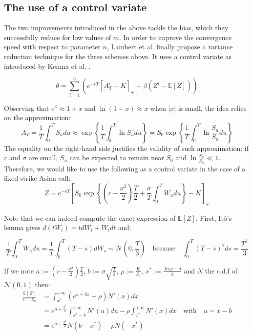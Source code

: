 \documentclass{article}
\begin{document}
\subsection{The use of a control variate}

The two improvements introduced in the above tackle the bias, which they successfully reduce for low values of $m$.
In order to improve the convergence speed with respect to parameter $n$,
Lambert et al. \cite{main} finally propose a variance reduction technique
for the three schemes above. It uses a control variate as introduced by Kemna et al. \cite{Vorst}.

\begin{equation}
	\theta = \sum_{i=1}^n \left( e^{-rT} \left[ A_T^i - K \right]_+ + \beta \left( Z^i - \mathbb E [Z] \right) \right)
	\tag{$\ast$}
\end{equation}

Observing that $e^x \approx 1 + x$ and $\ln(1 + x) \approx x$ when $| x |$ is small,
the idea relies on the approximation:
\[
	A_T = \frac{1}{T} \int_0^T S_u du \approx \exp \left\{ \frac{1}{T} \int_0^T \ln S_u du \right\}
	= S_0 \exp \left\{ \frac{1}{T} \int_0^T \ln \frac{S_u}{S_0} du \right\}
\]
The equality on the right-hand side justifies the validity of such approximation: if $r$ and $\sigma$ are small,
$S_u$ can be expected to remain near $S_0$ and $\ln \frac{S_u}{S_0} \ll 1$.
Therefore, we would like to use the following as a control variate in the case of a fixed-strike Asian call:
\[
	Z
	= e^{-rT} \left[ S_0 \exp \left\{ \left( r - \frac{\sigma^2}{2} \right) \frac{T}{2} +
		\frac{\sigma}{T} \int_0^T W_u du \right\}
		- K \right]_+
\]

Note that we can indeed compute the exact expression of $\mathbb E[Z]$. First, It\^o's lemma
gives $d(tW_t) = tdW_t + W_tdt$ and:

\[
	\frac{1}{T} \int_0^T W_u du = \frac{1}{T} \int_0^T (T-s) dW_s \sim \mathcal N \left(0, \frac{T}{3} \right)
	\quad \text{because} \quad \int_0^T (T-s)^2 ds = \frac{T^3}{3}
\]

If we note $a := \left( r - \frac{\sigma^2}{2} \right) \frac{T}{2}$, $b := \sigma \sqrt{\frac{T}{3}}$, $\rho :=\frac{K}{S_0}$,
$x^\ast := \frac{\ln \rho - a}{b}$ and $N$ the c.d.f of $\mathcal N (0, 1)$ then:
\begin{align*}
	\frac{\mathbb E[Z]}{e^{-rT} S_0}
	&= \int_{x^\ast}^{+ \infty} \left( e^{a + bx} - \rho \right) N'(x) dx \\
	&= e^{a + \frac{b^2}{2}} \int_{x^\ast - b}^{+ \infty} N'(u) du - \rho \int_{x^\ast}^{+ \infty} N'(x) dx
	\quad \text{with} \quad u = x - b \\
	&= e^{a + \frac{b^2}{2}} N(b - x^\ast) - \rho N(-x^\ast)
\end{align*}
	
\end{document}
